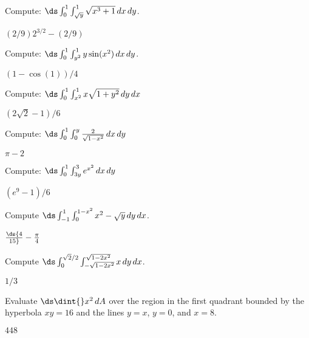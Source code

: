 \begin{exercises}
\begin{exercise}  Compute: $\ds \int_0^1\int_{\sqrt{y}}^1 
\sqrt{x^3+1}\,dx\,dy$.
\begin{answer} $(2/9)2^{3/2}-(2/9)$
\end{answer}\end{exercise}

\begin{exercise} Compute: $\ds \int_0^1\int_{y^2}^1 
y\sin(x^2)\,dx\,dy$.
\begin{answer} $(1-\cos(1))/4$
\end{answer}\end{exercise}

\begin{exercise} Compute: $\ds \int_0^1 \int_{x^2}^1 x\sqrt{1+y^2}\,dy\,dx$
\begin{answer} $(2\sqrt2-1)/6$
\end{answer}\end{exercise}

\begin{exercise} Compute: $\ds \int_0^1 \int_0^y
	  {2\over\sqrt{1-x^2}}\,dx\,dy$
\begin{answer} $\pi-2$
\end{answer}\end{exercise}

\begin{exercise} Compute: $\ds \int_0^1 \int_{3y}^3
	  e^{x^2}\,dx\,dy$
\begin{answer} $(e^9-1)/6$
\end{answer}\end{exercise}


\begin{exercise} Compute $\ds \int_{-1}^1\int_0^{1-x^2} x^2-\sqrt{y}\,dy\,dx$.
\begin{answer} $\ds {4\over15}-{\pi\over4}$
\end{answer}\end{exercise}

\begin{exercise} Compute 
$\ds \int_{0}^{\sqrt2/2}\int_{-\sqrt{1-2x^2}}^{\sqrt{1-2x^2}} x\,dy\,dx$.
\begin{answer} $1/3$
\end{answer}\end{exercise}


\begin{exercise} Evaluate $\ds\dint{} x^2\,dA$ over the region in the first
quadrant bounded by the hyperbola $xy=16$ and the lines $y=x$, $y=0$, and
$x=8$.
\begin{answer} $448$
\end{answer}\end{exercise}


\end{exercises}
